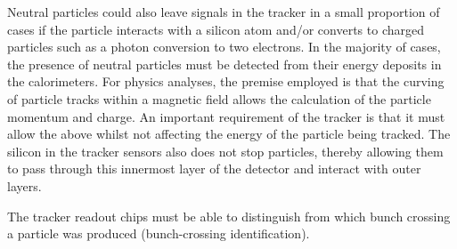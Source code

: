 Neutral particles could also leave signals in the tracker in a small proportion of cases if the particle
interacts with a silicon atom and/or converts to charged particles such as a photon conversion to two
electrons. In the majority of cases, the presence of neutral particles must be detected from their energy
deposits in the calorimeters.
For physics analyses, the premise employed is that the curving of particle tracks within a magnetic field
allows the calculation of the particle momentum and charge. An important requirement of the tracker is that it
must allow the above whilst not affecting the energy of the particle being tracked. The silicon in the tracker
sensors also does not stop particles, thereby allowing them to pass through this innermost layer of the
detector and interact with outer layers.


The tracker readout chips must be able to distinguish from which bunch crossing a particle was produced
(bunch-crossing identification).



